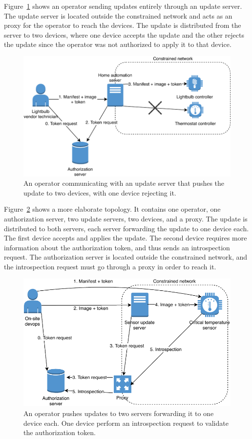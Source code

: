 \documentclass[0-thesis.tex]{subfiles}
\begin{document}
Figure~\ref{fig:smart-home} shows an operator sending updates entirely through an
update server. The update server is located outside the constrained network and acts as an
proxy for the operator to reach the devices. The update is distributed from the server to
two devices, where one device accepts the update and the other rejects the update since
the operator was not authorized to apply it to that device.

\begin{figure}
    \caption{An operator communicating with an update server that pushes the update to two
                devices, with one device rejecting it.}
    \label{fig:smart-home}
    \includegraphics{images/use-case-smart-home.pdf}
\end{figure}

Figure~\ref{fig:industry} shows a more elaborate topology. It contains one
operator, one authorization server, two update servers, two devices, and a proxy. The
update is distributed to both servers, each server forwarding the update to one device
each. The first device accepts and applies the update. The second device requires more
information about the authorization token, and thus sends an introspection request. The
authorization server is located outside the constrained network, and the introspection
request must go through a proxy in order to reach it.

\begin{figure}
    \caption{An operator pushes updates to two servers forwarding it to one device each. 
                One device perform an introspection request to validate the authorization 
                token.}
    \label{fig:industry}
    \includegraphics{images/use-case-industry.pdf}
\end{figure}
\end{document}
